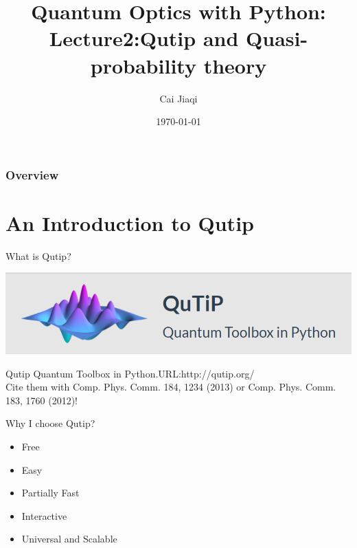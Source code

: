 \documentclass{beamer}
\title[Quantum Optics with Python]{Quantum Optics with Python: \\
	Lecture2:Qutip and Quasi-probability theory} %
\author{Cai Jiaqi} %
\institute[HUST] %
{
Huazhong University of Science and Technology \\ %
\medskip
\textit{caidish@hust.edu.cn} %
}
\date{\today} %
\begin{document}
\begin{frame}
\titlepage %
\end{frame}

\begin{frame}
\frametitle{Overview} %
\tableofcontents %
\end{frame}


\section{An Introduction to Qutip}
\begin{frame}{What is Qutip?}
\begin{center}
	\includegraphics[width=0.7\linewidth]{screenshot001}
\end{center}
\begin{block}{Qutip}
	Quantum Toolbox in Python.URL:http://qutip.org/ \\
	Cite them with  Comp. Phys. Comm. 184, 1234 (2013) or  Comp. Phys. Comm. 183, 1760 (2012)!
\end{block}
\end{frame}

\begin{frame}{Why I choose Qutip?}
\begin{itemize}
	\item Free
	\item Easy
	\item Partially Fast
	\item Interactive
	\item Universal and Scalable
\end{itemize}
\end{frame}
\end{document}

